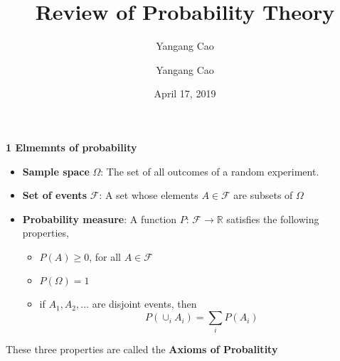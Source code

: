 \documentclass[10pt,a4paper,oneside]{beamer}
\author{Yangang Cao}
\author{Yangang Cao}
\title{Review of Probability Theory}
\date{April 17, 2019}
\begin{document}
	
\frame[plain]{\titlepage}

\begin{frame}
\vspace{0.5cm}
{\bfseries 1 Elmemnts of probability}
\begin{itemize}
\item {\bfseries Sample space} $\Omega$: The set of all outcomes of a random experiment.
\item {\bfseries Set of events} $\mathcal{F}$: A set whose elements $A \in \mathcal{F}$ are subsets of $\Omega$
\item {\bfseries Probability measure}: A function $P$: $\mathcal{F}\rightarrow\mathbb{R}$ satisfies the following properties,
\begin{itemize}
\item $P(A) \geqslant 0$, for all $A\in \mathcal{F}$
\item $P(\Omega)=1$
\item if $A_1, A_2,...$ are disjoint events, then
\[
P\left(\cup_{i} A_{i}\right)=\sum_{i} P\left(A_{i}\right)
\]
\end{itemize}
\end{itemize}
These three properties are called the \bfseries Axioms of Probalitity

\end{frame}
\end{document}
